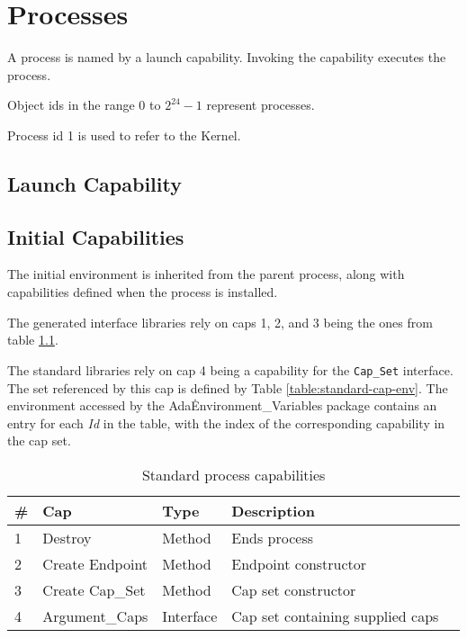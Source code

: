 \chapter{Processes}

A process is named by a launch capability.  Invoking the capability executes the process.

Object ids in the range $0$ to $2^{24} - 1$ represent processes.

Process id 1 is used to refer to the Kernel.

\section{Launch Capability}

\section{Initial Capabilities}

The initial environment is inherited from the parent process, along with capabilities defined when the process is installed.

The generated interface libraries rely on caps 1, 2, and 3 being the ones from table \ref{table:standard-caps}.

The standard libraries rely on cap 4 being a capability for the {\tt Cap\_Set} interface.
The set referenced by this cap is defined by Table \ref{table:standard-cap-env}.
The environment accessed by the Ada\.Environment\_Variables package contains an entry for each {\em Id} in the table, with the index of the corresponding capability in the cap set.

\begin{table}[ht]
\begin{tabular}{l l l l l}
\hline\hline
\# & Cap & Type & Description \\
\hline
1 & Destroy & Method & Ends process \\
2 & Create Endpoint & Method & Endpoint constructor \\
3 & Create Cap\_Set & Method & Cap set constructor \\
4 & Argument\_Caps & Interface & Cap set containing supplied caps \\
\hline
\end{tabular}
\caption{Standard process capabilities}
\label{table:standard-caps}
\end{table}

